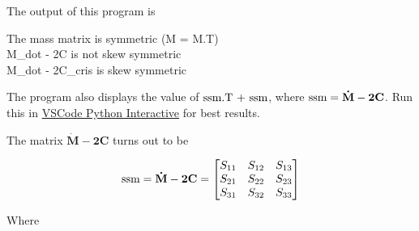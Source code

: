 

The output of this program is

\begin{displayquote}
    The mass matrix is symmetric (M = M.T) \\
    M\_dot - 2C is not skew symmetric \\
    M\_dot - 2C\_cris is skew symmetric
\end{displayquote}

The program also displays the value of $\textup{ssm.T + ssm}$, where $\textup{ssm} = \mathbf{\dot{M} - 2C}$. Run this in \href{https://code.visualstudio.com/docs/python/jupyter-support-py}{VSCode Python Interactive} for best results.

The matrix $\mathbf{\dot{M} - 2C}$ turns out to be

\begin{equation}
    \textup{ssm} = \mathbf{\dot{M} - 2C} = \begin{bmatrix}
        S_{11} & S_{12} & S_{13} \\
        S_{21} & S_{22} & S_{23} \\
        S_{31} & S_{32} & S_{33}
    \end{bmatrix}
    \label{eq:app-3r-dyn-ssm-mat}
\end{equation}

Where

